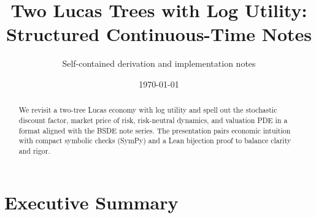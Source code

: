 ﻿\documentclass[11pt,letterpaper,oneside]{article}
\title{\vspace{-1.5em}Two Lucas Trees with Log Utility: Structured Continuous-Time Notes}
\author{\small Self-contained derivation and implementation notes}
\date{\small \today}
\numberwithin{equation}{section}
\newcommand{\1}{\mathbf{1}}
\begin{document}
\maketitle

\begin{abstract}
\noindent
We revisit a two-tree Lucas economy with log utility and spell out the stochastic discount factor, market price of risk, risk-neutral dynamics, and valuation PDE in a format aligned with the BSDE note series. The presentation pairs economic intuition with compact symbolic checks (SymPy) and a Lean bijection proof to balance clarity and rigor.
\end{abstract}

\tableofcontents

\newpage
\section*{Executive Summary }
\end{document}
